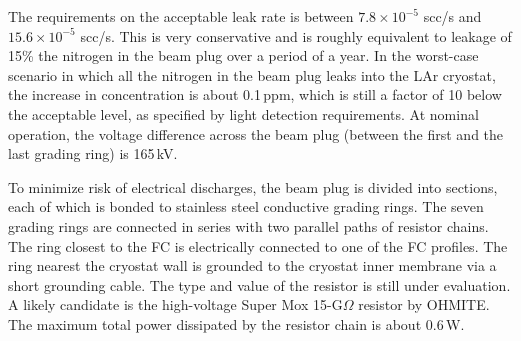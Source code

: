 
The requirements on the acceptable leak rate is between $7.8\times 10^{-5}$ scc/s and $15.6\times 10^{-5}$ scc/s. This is very conservative and is roughly equivalent to leakage of  15\% the nitrogen in the beam plug over a period of a year.
  In the worst-case scenario in which all the nitrogen in the beam plug leaks into the LAr cryostat, the increase in concentration is about 0.1\,ppm, which is still a factor of 10 below the acceptable level, as specified by light detection requirements.
  At nominal operation, the voltage difference across the beam plug (between the first and the last grading ring) is 165\,kV. 

    To minimize risk of electrical discharges, the beam plug is divided into sections, each of which is bonded to stainless steel conductive grading rings. The seven grading rings are connected in series with two parallel paths of resistor chains. The ring closest to the FC is electrically connected to one of the FC profiles. 
  The ring nearest the cryostat wall is grounded to the cryostat inner membrane via a short grounding cable. 
  The type and value of the resistor is still under evaluation.
  A likely candidate is the high-voltage Super Mox 15-G$\Omega$ resistor by OHMITE. The maximum total power dissipated by the resistor chain is about 0.6\,W.


